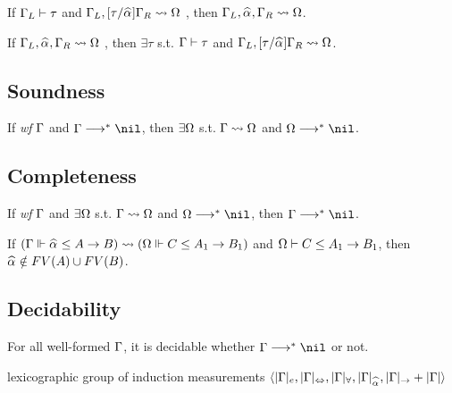 \begin{lemma}[Insert]
If $\Gamma_L\vdash \tau$ and $\Gm_L, [\tau/\al]\Gm_R \sto \Om$
, then $\Gm_L, \al, \Gm_R \sto \Om$.
\end{lemma}
\begin{lemma}[Extract]
If $\Gm_L, \al, \Gm_R \sto \Om$
, then $\exists \tau$ s.t. $\Gamma\vdash\tau$ and $\Gm_L, [\tau/\al]\Gm_R \sto \Om$.
\end{lemma}

\subsection{Soundness}

\begin{theorem}[Soundness]
If \emph{wf }$\Gamma$ and $\Gm \redto \nil$, then $\exists \Omega$ s.t. $\Gamma\rightsquigarrow\Omega$ and $\Om\redto\nil$.
\end{theorem}

\subsection{Completeness}

\begin{theorem}[Completeness]
If \emph{wf }$\Gamma$ and $\exists \Omega$ s.t. $\Gamma\rightsquigarrow\Omega$ and $\Om\redto\nil$, then $\Gm \redto \nil$.
\end{theorem}

\begin{lemma}
If $(\Gm \Vdash \al \le A \to B) \sto (\Om \Vdash C \le A_1 \to B_1)$ and $\Omega \vdash C \le A_1 \to B_1$,
then $\al\notin FV(A) \cup FV(B)$.
\end{lemma}

\subsection{Decidability}
\begin{theorem}[Decidability]
For all well-formed $\Gamma$, it is decidable whether $\Gm\redto\nil$ or not.
\end{theorem}

lexicographic group of induction measurements
$\langle |\Gm|_e, |\Gm|_\Leftrightarrow, |\Gm|_\forall, |\Gm|_{\al}, |\Gm|_\to + |\Gm| \rangle$

